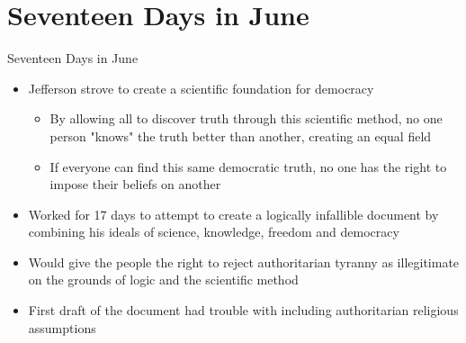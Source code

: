 \section{Seventeen Days in June}
\begin{frame}{Seventeen Days in June}{}
	\begin{itemize}
		\item Jefferson strove to create a scientific foundation for democracy
			\begin{itemize}
				\item By allowing all to discover truth through this scientific method, no one person "knows" the truth better than another, creating an equal field
				\item If everyone can find this same democratic truth, no one has the right to impose their beliefs on another
			\end{itemize}
		\item Worked for 17 days to attempt to create a logically infallible document by combining his ideals of science, knowledge, freedom and democracy
		\item Would give the people the right to reject authoritarian tyranny as illegitimate on the grounds of logic and the scientific method
		\item First draft of the document had trouble with including authoritarian religious assumptions
	\end{itemize}
\end{frame}
